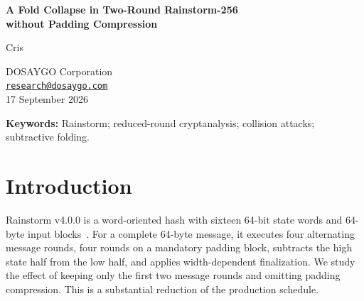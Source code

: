 \documentclass[10pt]{article}
\theoremstyle{definition}
\begin{document}
\begin{center}
{\LARGE\bfseries\color{Navy} A Fold Collapse in Two-Round Rainstorm-256\\without Padding Compression}\par
\vspace{0.7em}
{\large Cris}\par
DOSAYGO Corporation\\
\href{mailto:research@dosaygo.com}{\texttt{research@dosaygo.com}}\\
\vspace{0.4em}
17 September 2026
\end{center}

\begin{abstract}
We give an algebraic collision reduction for a precisely specified variant of Rainstorm v4.0.0: one 64-byte message block, seed zero, two message rounds, no padding compression, and the unchanged fold and output finalization. A uniquely programmable first round produces a family of distinct messages indexed by one 64-bit word. On this family five folded words vanish identically, and equality of a sixth word implies equality of the complete 256-bit digest. We prove this implication, including preservation through finalization, and exhibit a concrete collision found using 4,070,333,044 evaluations of the resulting 64-bit map, plus 33,707 replay evaluations. This is an observed cost; an expected birthday-scale search cost requires a random-mapping heuristic. One restored padding round preserves five fold equalities but introduces an additional aggregate condition. The result identifies a specific interaction between message programming, cross-half XOR, and subtractive folding. It does not give a collision attack on production Rainstorm, which uses four message rounds and four padding rounds. We include the complete restricted-target definition and an executable witness verifier.
\end{abstract}
\noindent\textbf{Keywords:} Rainstorm; reduced-round cryptanalysis; collision attacks; subtractive folding.

\section{Introduction}
Rainstorm v4.0.0 is a word-oriented hash with sixteen 64-bit state words and 64-byte input blocks~\cite{rainstorm-v4}. For a complete 64-byte message, it executes four alternating message rounds, four rounds on a mandatory padding block, subtracts the high state half from the low half, and applies width-dependent finalization. We study the effect of keeping only the first two message rounds and omitting padding compression. This is a substantial reduction of the production schedule.
\end{document}
